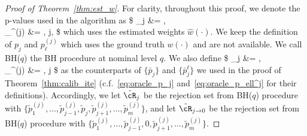 \begin{proof}[Proof of Theorem~\ref{thm:est_w}]

For clarity, throughout this proof, we denote the p-values
used in the algorithm as
\$
_j &=   , \\
_{\ell}^{(j)} &= , \quad \ell\neq j,
\$
which uses the estimated weights $\hat{w}(\cdot)$.
We keep the definition of $p_j$ and $p_\ell^{(j)}$
which uses the ground truth $w(\cdot)$ and are not available.
We call BH($q$) the BH procedure at nominal level $q$.
We also define
\$
_j &=   , \\
_{\ell}^{(j)} &= , \quad \ell\neq j
\$
as the counterparts of $\{\bar{p}_j\}$ and $\{\bar{p}_j^{\ell}\}$
we used in the proof of Theorem~\ref{thm:calib_ite} (c.f.~\eqref{eq:oracle_p_j}
and~\eqref{eq:oracle_p_ell^j} for their definitions).
Accordingly, we let
$\tilde\cR_j$
be the rejection set from BH($q$) procedure with
$\{\tilde{p}_1^{(j)},\dots,\tilde{p}_{j-1}^{(j)},\tilde{p}_j,\tilde{p}_{j+1}^{(j)},\dots,\tilde{p}_m^{(j)}\}$, and let
$\tilde\cR_{j\to 0}$
be the rejection set from BH($q$) procedure with
$\{\tilde{p}_1^{(j)},\dots,\tilde{p}_{j-1}^{(j)},0,\tilde{p}_{j+1}^{(j)},\dots,\tilde{p}_m^{(j)}\}$.



\end{proof}
